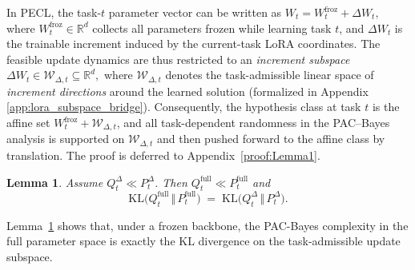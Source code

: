 \documentclass{article}
\theoremstyle{plain}
\newtheorem{lemma}[theorem]{Lemma}
\theoremstyle{definition}
\theoremstyle{remark}
\begin{document}
In PECL, the task-$t$ parameter vector can be written as
$
W_t = W^{\mathrm{froz}}_t + \Delta W_t,
$
where $W^{\mathrm{froz}}_t\in\mathbb R^d$ collects all parameters frozen while learning task $t$, and $\Delta W_t$ is the trainable increment induced by the current-task LoRA coordinates. The feasible update dynamics are thus restricted to an \emph{increment subspace}
$
\Delta W_t \in \mathcal W_{\Delta,t}\subseteq \mathbb R^d,
$
where $\mathcal W_{\Delta,t}$ denotes the task-admissible linear space of \emph{increment directions} around the learned
solution (formalized in Appendix \ref{app:lora_subspace_bridge}). Consequently, the hypothesis class at task $t$ is the affine
set $W^{\mathrm{froz}}_t + \mathcal W_{\Delta,t}$, and all task-dependent randomness in the PAC--Bayes analysis is supported
on $\mathcal W_{\Delta,t}$ and then pushed forward to the affine class by translation. The proof is deferred to Appendix~\ref{proof:Lemma1}.
\begin{lemma}
\label{lem:kl-decomp-pecl}
Assume $Q_t^\Delta \ll P_t^\Delta$. Then $Q_t^{\mathrm{full}} \ll P_t^{\mathrm{full}}$ and
$$
\mathrm{KL}\bigl(Q_t^{\mathrm{full}} \,\Vert\, P_t^{\mathrm{full}}\bigr)
\;=\;
\mathrm{KL}\bigl(Q_t^\Delta \,\Vert\, P_t^\Delta\bigr).
$$
\end{lemma}
Lemma~\ref{lem:kl-decomp-pecl} shows that, under a frozen backbone, the PAC-Bayes complexity in the full parameter space is exactly the KL divergence on the task-admissible update subspace. 
\end{document}
